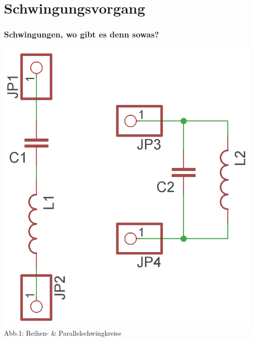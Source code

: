 

\subtitle{Technik Klasse E 07: \\
          Schwingkreise \& Filter \\[2em]}
\date{Stand 10.11.2015}


\section*{Schwingungs\-vorgang}

\begin{frame}
\frametitle{Schwingungen, wo gibt es denn sowas?}
	\begin{center}
		\includegraphics[width=\textwidth,height=.8\textheight,keepaspectratio]{e07/Schwingkreise.png}\\
		Abb.1: Reihen- \& Parallelschwingkreise
	\end{center}
\end{frame}

